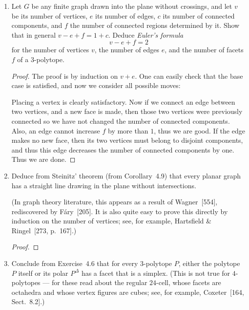 \documentclass{article}
\begin{document}
\begin{enumerate}
\begin{solution}
\begin{figure}[h]
\caption{Separating circuit for an Octahedron}
\end{figure}
\end{solution}

\item Let $G$ be any finite graph drawn into the plane without crossings, and let $v$ be its number of vertices, $e$ its number of edges, $c$ its number of connected components, and $f$ the number of connected regions determined by it. Show that in general $v - e + f = 1 + c$.
Deduce \emph{Euler's formula}
\[v - e + f = 2\]
for the number of vertices $v$, the number of edges $e$, and the number of facets $f$ of a $3$-polytope.

\begin{proof}
The proof is by induction on $v+e$. One can easily check that the base case is satisfied, and now we consider all possible moves:

Placing a vertex is clearly satisfactory. Now if we connect an edge between two vertices, and a new face is made, then those two vertices were previously connected so we have not changed the number of connected components. Also, an edge cannot increase $f$ by more than $1$, thus we are good. If the edge makes no new face, then its two vertices must belong to disjoint components, and thus this edge decreases the number of connected components by one. Thus we are done.
\end{proof}

\item Deduce from Steinitz' theorem (from Corollary~4.9) that every planar graph has a straight line drawing in the plane without intersections. 

(In graph theory literature, this appears as a result of Wagner~[554], rediscovered by F\'ary~[205]. It is also quite easy to prove this directly by induction on the number of vertices; see, for example, Hartsfield \& Ringel~[273, p.~167].)

\begin{proof}
\end{proof}

\item Conclude from Exercise~4.6 that for every $3$-polytope $P$, either the polytope $P$ itself or its polar $P^\Delta$ has a facet that is a simplex. (This is not true for $4$-polytopes --- for these read about the regular $24$-cell, whose facets are octahedra and whose vertex figures are cubes; see, for example, Coxeter~[164, Sect.~8.2].)


\end{enumerate}
\end{document}
